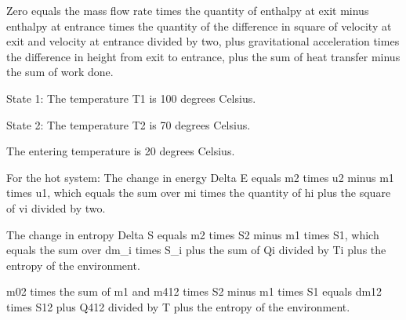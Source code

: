 Zero equals the mass flow rate times the quantity of enthalpy at exit minus enthalpy at entrance times the quantity of the difference in square of velocity at exit and velocity at entrance divided by two, plus gravitational acceleration times the difference in height from exit to entrance, plus the sum of heat transfer minus the sum of work done.

State 1: The temperature T1 is 100 degrees Celsius.

State 2: The temperature T2 is 70 degrees Celsius.

The entering temperature is 20 degrees Celsius.

For the hot system: The change in energy Delta E equals m2 times u2 minus m1 times u1, which equals the sum over mi times the quantity of hi plus the square of vi divided by two.

The change in entropy Delta S equals m2 times S2 minus m1 times S1, which equals the sum over dm_i times S_i plus the sum of Qi divided by Ti plus the entropy of the environment.

m02 times the sum of m1 and m412 times S2 minus m1 times S1 equals dm12 times S12 plus Q412 divided by T plus the entropy of the environment.